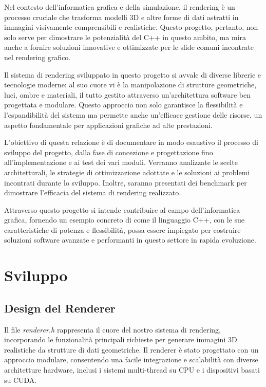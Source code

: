 \documentclass[12pt]{article}
\begin{document}
Nel contesto dell'informatica grafica e della simulazione, il rendering è un processo cruciale che trasforma modelli 3D e altre forme di dati astratti in immagini visivamente comprensibili e realistiche. Questo progetto, pertanto, non solo serve per dimostrare le potenzialità del C++ in questo ambito, ma mira anche a fornire soluzioni innovative e ottimizzate per le sfide comuni incontrate nel rendering grafico.

Il sistema di rendering sviluppato in questo progetto si avvale di diverse librerie e tecnologie moderne: al suo cuore vi è la manipolazione di strutture geometriche, luci, ombre e materiali, il tutto gestito attraverso un'architettura software ben progettata e modulare. Questo approccio non solo garantisce la flessibilità e l'espandibilità del sistema ma permette anche un'efficace gestione delle risorse, un aspetto fondamentale per applicazioni grafiche ad alte prestazioni.

L'obiettivo di questa relazione è di documentare in modo esaustivo il processo di sviluppo del progetto, dalla fase di concezione e progettazione fino all'implementazione e ai test dei vari moduli. Verranno analizzate le scelte architetturali, le strategie di ottimizzazione adottate e le soluzioni ai problemi incontrati durante lo sviluppo. Inoltre, saranno presentati dei benchmark per dimostrare l'efficacia del sistema di rendering realizzato.

Attraverso questo progetto si intende contribuire al campo dell'informatica grafica, fornendo un esempio concreto di come il linguaggio C++, con le sue caratteristiche di potenza e flessibilità, possa essere impiegato per costruire soluzioni software avanzate e performanti in questo settore in rapida evoluzione.

\section{Sviluppo}


\subsection{Design del Renderer}
Il file \textit{renderer.h} rappresenta il cuore del nostro sistema di rendering, incorporando le funzionalità principali richieste per generare immagini 3D realistiche da strutture di dati geometriche. Il renderer è stato progettato con un approccio modulare, consentendo una facile integrazione e scalabilità con diverse architetture hardware, inclusi i sistemi multi-thread su CPU e i dispositivi basati su CUDA.
\end{document}

